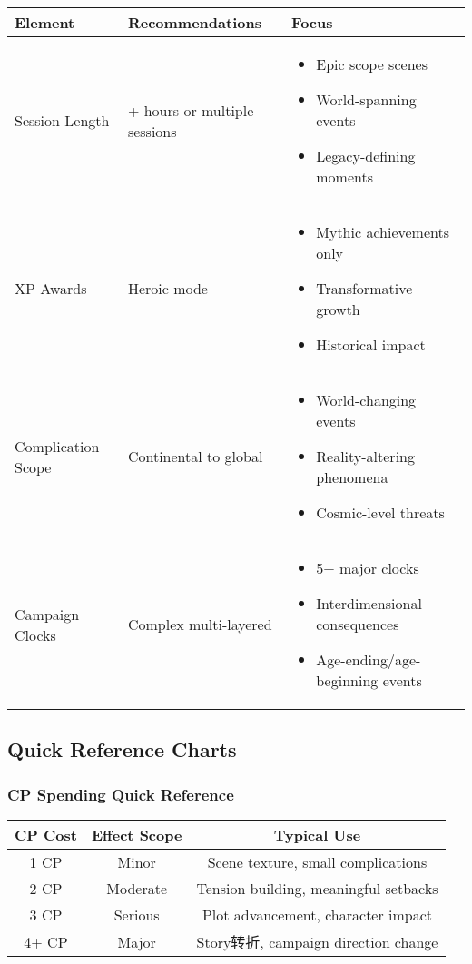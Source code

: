 \documentclass[11pt,letterpaper]{article}
\begin{document}
\begin{longtable}{|>{\raggedright\arraybackslash}p{3cm}|>{\raggedright\arraybackslash}p{4cm}|>{\raggedright\arraybackslash}p{5cm}|}
\hline
\textbf{Element} & \textbf{Recommendations} & \textbf{Focus} \\
\hline
Session Length & 6+ hours or multiple sessions & 
\begin{itemize}
    \item Epic scope scenes
    \item World-spanning events
    \item Legacy-defining moments
\end{itemize} \\
\hline
XP Awards & Heroic mode & 
\begin{itemize}
    \item Mythic achievements only
    \item Transformative growth
    \item Historical impact
\end{itemize} \\
\hline
Complication Scope & Continental to global & 
\begin{itemize}
    \item World-changing events
    \item Reality-altering phenomena
    \item Cosmic-level threats
\end{itemize} \\
\hline
Campaign Clocks & Complex multi-layered & 
\begin{itemize}
    \item 5+ major clocks
    \item Interdimensional consequences
    \item Age-ending/age-beginning events
\end{itemize} \\
\hline
\end{longtable}

\subsection{Quick Reference Charts}

\subsubsection{CP Spending Quick Reference}

\begin{center}
\begin{tabular}{|c|c|c|}
\hline
\textbf{CP Cost} & \textbf{Effect Scope} & \textbf{Typical Use} \\
\hline
1 CP & Minor & Scene texture, small complications \\
\hline
2 CP & Moderate & Tension building, meaningful setbacks \\
\hline
3 CP & Serious & Plot advancement, character impact \\
\hline
4+ CP & Major & Story转折, campaign direction change \\
\hline
\end{tabular}
\end{center}
\end{document}

